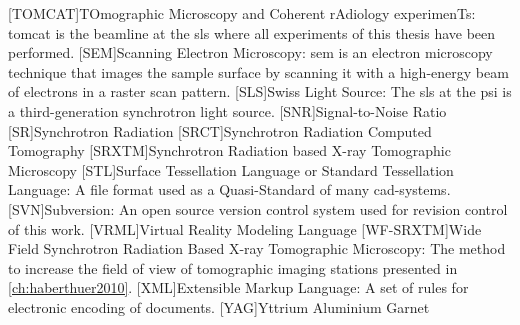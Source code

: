 \begin{acronym}[WF-SRXTM]
		[TOMCAT]{TOmographic Microscopy and Coherent rAdiology experimenTs}: \acs{tomcat} is the beamline at the \acs{sls} where all experiments of this thesis have been performed.
		[SEM]{Scanning Electron Microscopy}: \acs{sem} is an electron microscopy technique that images the sample surface by scanning it with a high-energy beam of electrons in a raster scan pattern.
		[SLS]{Swiss Light Source}: The \acs{sls} at the \acs{psi} is a third-generation synchrotron light source.
		[SNR]{Signal-to-Noise Ratio}
		[SR]{Synchrotron Radiation}
		{Synchrotron Radiation Computed Tomography}
		[SRXTM]{Synchrotron Radiation based X-ray Tomographic Mi\-cros\-co\-py}
		[STL]{Surface Tessellation Language or Standard Tessellation Language}: A file format used as a Quasi-Standard of many \acs{cad}-systems.
		[SVN]{Subversion}: An open source version control system used for revision control of this work.
		{Virtual Reality Modeling Language}
		[WF-SRXTM]{Wide Field Synchrotron Radiation Based X-ray Tomographic Microscopy}: The method to increase the field of view of tomographic imaging stations presented in \autoref{ch:haberthuer2010}.
		[XML]{Extensible Markup Language}: A set of rules for electronic encoding of documents.
		[YAG]{Yttrium Aluminium Garnet}
	\end{acronym}
\endgroup